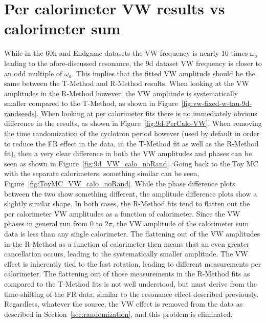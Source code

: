 \documentclass[12pt,letterpaper]{article}
\newcommand{\figref}[1]{Figure~\ref{#1}}
\def\wa{$\omega_{a}$\xspace}
\begin{document}
\clearpage


\section{Per calorimeter VW results vs calorimeter sum}


While in the 60h and Endgame datasets the VW frequency is nearly 10 times \wa leading to the afore-discussed resonance, the 9d dataset VW frequency is closer to an odd multiple of \wa. This implies that the fitted VW amplitude should be the same between the T-Method and R-Method results. When looking at the VW amplitudes in the R-Method however, the VW amplitude is systematically smaller compared to the T-Method, as shown in \figref{fig:vw-fixed-w-tau-9d-randseeds}. When looking at per calorimeter fits there is no immediately obvious difference in the results, as shown in \figref{fig:9d-PerCalo-VW}. When removing the time randomization of the cyclotron period however (used by default in order to reduce the FR effect in the data, in the T-Method fit as well as the R-Method fit), then a very clear difference in both the VW amplitudes and phases can be seen as shown in \figref{fig:9d_VW_calo_noRand}. Going back to the Toy MC with the separate calorimeters, something similar can be seen, \figref{fig:ToyMC_VW_calo_noRand}. While the phase difference plots between the two show something different, the amplitude difference plots show a slightly similar shape. In both cases, the R-Method fits tend to flatten out the per calorimeter VW amplitudes as a function of calorimeter. Since the VW phases in general run from 0 to $2\pi$, the VW amplitude of the calorimeter sum data is less than any single calorimeter. The flattening out of the VW amplitudes in the R-Method as a function of calorimeter then means that an even greater cancellation occurs, leading to the systematically smaller amplitude. The VW effect is inherently tied to the fast rotation, leading to different measurements per calorimeter. The flattening out of those measurements in the R-Method fits as compared to the T-Method fits is not well understood, but must derive from the time-shifting of the FR data, similar to the resonance effect described previously. Regardless, whatever the source, the VW effect is removed from the data as described in Section~\ref{sec:randomization}, and this problem is eliminated.
\end{document}
